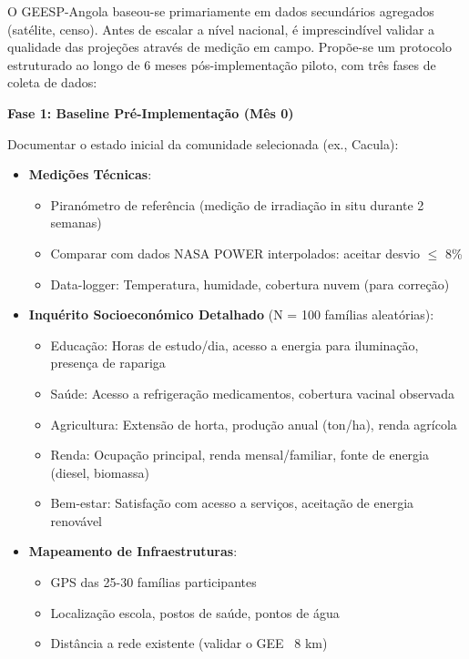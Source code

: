 \documentclass[12pt, a4paper]{article}
\begin{document}
O GEESP-Angola baseou-se primariamente em dados secundários agregados (satélite, censo). 
Antes de escalar a nível nacional, é imprescindível validar a qualidade das projeções 
através de medição em campo. Propõe-se um protocolo estruturado ao longo de 6 meses 
pós-implementação piloto, com três fases de coleta de dados:

\textbf{Fase 1: Baseline Pré-Implementação (Mês 0)}

Documentar o estado inicial da comunidade selecionada (ex., Cacula):

\begin{itemize}
\item \textbf{Medições Técnicas}:
  \begin{itemize}
  \item Piranómetro de referência (medição de irradiação in situ durante 2 semanas)
  \item Comparar com dados NASA POWER interpolados: aceitar desvio \(\leq\) 8\%
  \item Data-logger: Temperatura, humidade, cobertura nuvem (para correção)
  \end{itemize}

\item \textbf{Inquérito Socioeconómico Detalhado} (N = 100 famílias aleatórias):
  \begin{itemize}
  \item Educação: Horas de estudo/dia, acesso a energia para iluminação, presença de rapariga
  \item Saúde: Acesso a refrigeração medicamentos, cobertura vacinal observada
  \item Agricultura: Extensão de horta, produção anual (ton/ha), renda agrícola
  \item Renda: Ocupação principal, renda mensal/familiar, fonte de energia (diesel, biomassa)
  \item Bem-estar: Satisfação com acesso a serviços, aceitação de energia renovável
  \end{itemize}

\item \textbf{Mapeamento de Infraestruturas}:
  \begin{itemize}
  \item GPS das 25-30 famílias participantes
  \item Localização escola, postos de saúde, pontos de água
  \item Distância a rede existente (validar o GEE ~8 km)
  \end{itemize}
\end{itemize}
\end{document}
